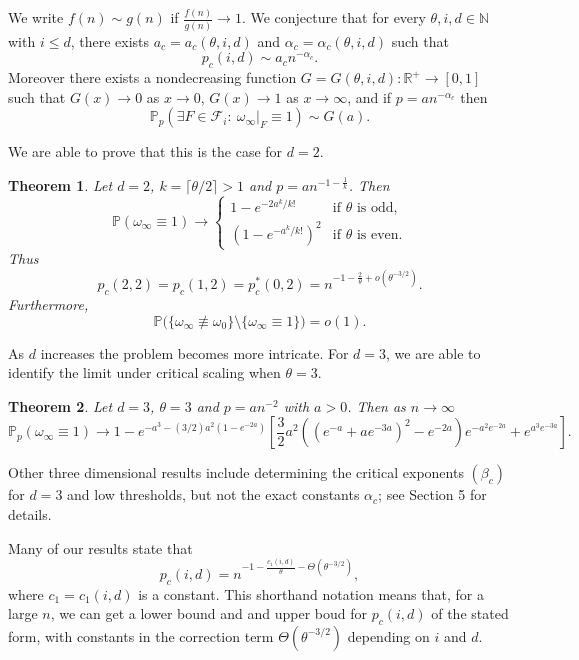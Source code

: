 \documentclass{amsart}
\newcommand{\prob}{\mathbb{P}}
\newcommand{\N}{\mathbb{N}}
\newcommand{\R}{\mathbb{R}}
\newcommand{\threshold}{\theta}
\newcommand{\cF}{\mathcal F}
\numberwithin{equation}{section}
\newtheorem{theorem}{Theorem}[section]
\theoremstyle{definition}
\theoremstyle{remark}
\begin{document}
We write $f(n)\sim g(n)$ if $\frac{f(n)}{g(n)}  \to 1.$ 
We conjecture that for every $\threshold, i, d \in \N$ with $i \leq d$, there exists $a_c=a_c(\theta,i,d)$ and $\alpha_c=\alpha_c(\theta,i,d)$
such that
$$p_c(i,d) \sim a_cn^{-\alpha_c}.$$
Moreover there exists a nondecreasing function $G=G(\theta,i,d):\R^+ \to [0,1]$ such that
$G(x) \to 0$ as $x \to 0$, 
$G(x) \to 1$ as $x \to \infty$, and if $p=a n^{-\alpha_c}$ then
$$\prob_{p}(\exists F \in \cF_i:\  \omega_\infty|_F\equiv1) \sim G(a).$$

We are able to prove that this is the case for $d=2$.
\begin{theorem}
\label{2d-thm}
Let $d=2$, $k = \lceil \threshold/2 \rceil > 1$ and $p=an^{-1-\frac{1}{k}}$. 
Then
$$
\prob( \omega_\infty\equiv 1) \to
\begin{cases}
1-e^{-2a^k/k!}& \text{if $\threshold$ is odd,}
\\
(1-e^{-a^k/k!})^2 &\text{if $\threshold$ is even.}
\end{cases}
$$
Thus
$$p_c(2,2)=p_c(1,2)=p^*_c(0,2)=n^{-1-\frac{2}{\threshold} + o(\threshold^{-3/2})}.$$
Furthermore,
$$\prob\big(\{\omega_\infty \not\equiv \omega_0\} \setminus \{\omega_\infty\equiv 1\}\big)=o(1).$$
\end{theorem}

As $d$ increases the problem becomes more intricate. For $d=3$, we are able to identify the limit under critical scaling when 
$\threshold=3$. 

\begin{theorem}
\label{3d-spanning-thm}
Let $d=3$, $\threshold=3$ and $p = an^{-2}$ with $a>0$.  Then as $n\to \infty$
\begin{equation}
\prob_{p}(\omega_\infty \equiv 1) \to 1 - e^{-a^3 - (3/2)a^2(1-e^{-2a})}\left[\frac{3}{2} a^2\left(\left(e^{-a}+ae^{-3a}\right)^2-e^{-2a}\right)e^{-a^2e^{-2a}} + e^{a^3e^{-3a}} \right].
\end{equation}
\end{theorem}

Other three dimensional results include 
determining the critical exponents $(\beta_c)$ for $d=3$ and low thresholds, but not the exact constants $\alpha_c$; 
see Section 5 for details. 

Many of our results state that
$$p_c(i,d)=n^{-1 - \frac{c_1(i,d)}{\threshold} - \Theta(\threshold^{-3/2})},$$
where $c_1=c_1(i,d)$ is a constant. This shorthand notation means that, for a large 
$n$, we can get a lower bound and and upper boud for $p_c(i,d)$ of the stated form, 
with constants in the correction term $\Theta(\threshold^{-3/2})$ depending on $i$ and $d$.
\end{document}
